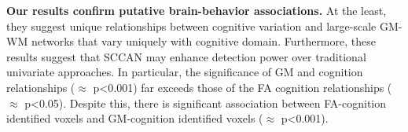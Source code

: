 \documentclass{llncs}
\begin{document}


 {\bf Our results confirm putative brain-behavior associations.}  At
 the least, they suggest unique relationships between cognitive variation
 and large-scale GM-WM networks that vary uniquely with cognitive domain. Furthermore,
 these results suggest that SCCAN may enhance detection power over
 traditional univariate approaches.  In particular, the significance
 of GM and cognition relationships ($\approx$  p<0.001) far exceeds those of the FA
 cognition relationships ($\approx$ p<0.05).  Despite this, there is
 significant association between FA-cognition identified voxels and GM-cognition
 identified voxels ($\approx$  p<0.001).  




\end{document}
